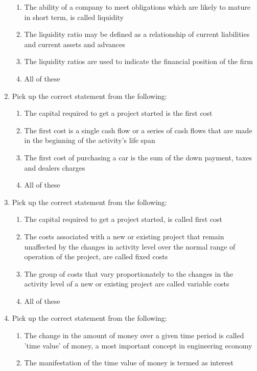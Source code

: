 \documentclass[11pt,a4paper]{article}
\begin{document}
\begin{enumerate}
\begin{enumerate}[label=\Alph*.]
\item{The ability of a company to meet obligations which are likely to mature in short term, is called liquidity}
\item{The liquidity ratio may be defined as a relationship of current liabilities and current assets and advances}
\item{The liquidity ratios are used to indicate the financial position of the firm}
\item{All of these}
\end{enumerate}
\item{Pick up the correct statement from the following:}
\begin{enumerate}[label=\Alph*.]
\item{The capital required to get a project started is the first cost}
\item{The first cost is a single cash flow or a series of cash flows that are made in the beginning of the activity's life span}
\item{The first cost of purchasing a car is the sum of the down payment, taxes and dealers charges}
\item{All of these}
\end{enumerate}
\item{Pick up the correct statement from the following:}
\begin{enumerate}[label=\Alph*.]
\item{The capital required to get a project started, is called first cost}
\item{The costs associated with a new or existing project that remain unaffected by the changes in activity level over the normal range of operation of the project, are called fixed costs}
\item{The group of costs that vary proportionately to the changes in the activity level of a new or existing project are called variable costs}
\item{All of these}
\end{enumerate}
\item{Pick up the correct statement from the following:}
\begin{enumerate}[label=\Alph*.]
\item{The change in the amount of money over a given time period is called 'time value' of money, a most important concept in engineering economy}
\item{The manifestation of the time value of money is termed as interest}

\end{enumerate}
\end{enumerate}
\end{document}
